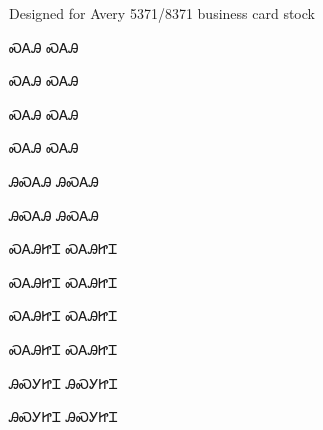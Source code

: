 \documentclass[avery5371]{flashcards}%
\begin{document}
    Designed for Avery 5371/8371 business card stock

    \begin{flashcard}{\Huge ᏍᎪᎯ}
        \Huge ᏍᎪᎯ
    \end{flashcard}

    \begin{flashcard}{\Huge ᏍᎪᎯ}
        \Huge ᏍᎪᎯ
    \end{flashcard}

    \begin{flashcard}{\Huge ᏍᎪᎯ}
        \Huge ᏍᎪᎯ
    \end{flashcard}

    \begin{flashcard}{\Huge ᏍᎪᎯ}
        \Huge ᏍᎪᎯ
    \end{flashcard}

    \begin{flashcard}{\Huge ᎯᏍᎪᎯ}
        \Huge ᎯᏍᎪᎯ
    \end{flashcard}

    \begin{flashcard}{\Huge ᎯᏍᎪᎯ}
        \Huge ᎯᏍᎪᎯ
    \end{flashcard}

    \begin{flashcard}{\Huge ᏍᎪᎯᏥᏆ}
        \Huge ᏍᎪᎯᏥᏆ
    \end{flashcard}

    \begin{flashcard}{\Huge ᏍᎪᎯᏥᏆ}
        \Huge ᏍᎪᎯᏥᏆ
    \end{flashcard}

    \begin{flashcard}{\Huge ᏍᎪᎯᏥᏆ}
        \Huge ᏍᎪᎯᏥᏆ
    \end{flashcard}

    \begin{flashcard}{\Huge ᏍᎪᎯᏥᏆ}
        \Huge ᏍᎪᎯᏥᏆ
    \end{flashcard}

    \begin{flashcard}{\Huge ᎯᏍᎩᏥᏆ}
        \Huge ᎯᏍᎩᏥᏆ
    \end{flashcard}

    \begin{flashcard}{\Huge ᎯᏍᎩᏥᏆ}
        \Huge ᎯᏍᎩᏥᏆ
    \end{flashcard}

\end{document}
